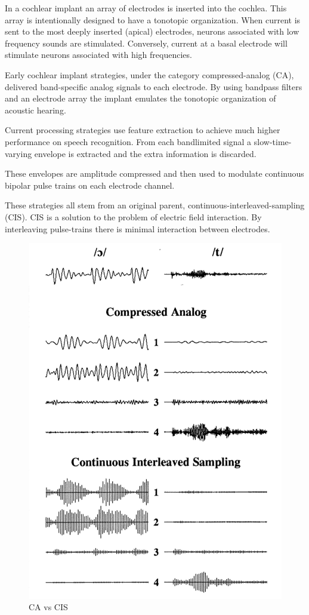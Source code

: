 \documentclass [11pt, proquest] {uwthesis}[2015/03/03]
\begin{document}

In a cochlear implant an array of electrodes is inserted into the cochlea.  This array is intentionally designed to have a tonotopic organization.  When current is sent to the most deeply inserted (apical) electrodes, neurons associated with low frequency sounds are stimulated.  Conversely, current at a basal electrode will stimulate neurons associated with high frequencies.

Early cochlear implant strategies, under the category compressed-analog (CA), delivered band-specific analog signals to each electrode.  By using bandpass filters and an electrode array the implant emulates the tonotopic organization of acoustic hearing.

Current processing strategies use feature extraction to achieve much higher performance on speech recognition.  From each bandlimited signal a slow-time-varying envelope is extracted and the extra information is discarded.

These envelopes are amplitude compressed and then used to modulate continuous bipolar pulse trains on each electrode channel.

These strategies all stem from an original parent, continuous-interleaved-sampling (CIS).  CIS is a solution to the problem of electric field interaction.  By interleaving pulse-trains there is minimal interaction between electrodes.


\begin{figure}[!ht]
  \centering
    \includegraphics[width=.5\textwidth]{caVScis}   
    \caption{CA vs CIS}
\end{figure}
\end{document}
